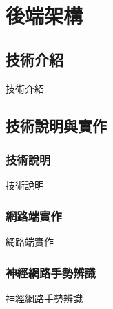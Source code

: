 \chapter{後端架構}
\section{技術介紹}

    技術介紹

\section{技術說明與實作}
\subsection{技術說明}

    技術說明

\subsection{網路端實作}

    網路端實作

\subsection{神經網路手勢辨識}

    神經網路手勢辨識
